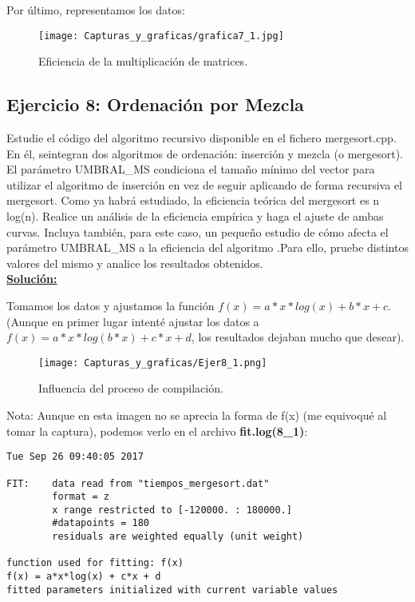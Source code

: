 \documentclass[11pt,a4paper]{article}
\begin{document}
{\newpage

Por último, representamos los datos:

\begin{figure}[H]
	\centering
	\texttt{[image: Capturas\_y\_graficas/grafica7\_1.jpg]}
	\caption{Eficiencia de la multiplicación de matrices.}
\end{figure}

\subsection{Ejercicio 8: Ordenación por Mezcla}
Estudie el código del algoritmo recursivo disponible en el fichero mergesort.cpp. En él, seintegran dos algoritmos de ordenación: inserción y mezcla (o mergesort). El parámetro UMBRAL\_MS condiciona el tamaño mínimo del vector para utilizar el algoritmo de inserción en vez de seguir aplicando de forma recursiva el mergesort. Como ya habrá estudiado, la eficiencia teórica del mergesort es n log(n). Realice un análisis de la eficiencia empírica y haga el ajuste de ambas curvas. Incluya también, para este caso, un pequeño estudio de cómo afecta el parámetro UMBRAL\_MS a la eficiencia del algoritmo .Para ello, pruebe distintos valores del mismo y analice los resultados obtenidos. \\

\textbf{\underline{Solución:}}

Tomamos los datos y ajustamos la función $f(x) = a*x*log(x) + b*x + c$. (Aunque en primer lugar intenté ajustar los datos a $f(x) = a*x*log(b*x) + c*x + d$, los resultados dejaban mucho que desear).

\begin{figure}[H]
	\centering
	\texttt{[image: Capturas\_y\_graficas/Ejer8\_1.png]}
	\caption{Influencia del proceso de compilación.}
\end{figure}

Nota: Aunque en esta imagen no se aprecia la forma de f(x) (me equivoqué al tomar la captura), podemos verlo en el archivo \textbf{fit.log(8\_1)}:

\begin{verbatim}
Tue Sep 26 09:40:05 2017

FIT:    data read from "tiempos_mergesort.dat"
        format = z
        x range restricted to [-120000. : 180000.]
        #datapoints = 180
        residuals are weighted equally (unit weight)

function used for fitting: f(x)
f(x) = a*x*log(x) + c*x + d
fitted parameters initialized with current variable values


\end{verbatim}}
\end{document}
